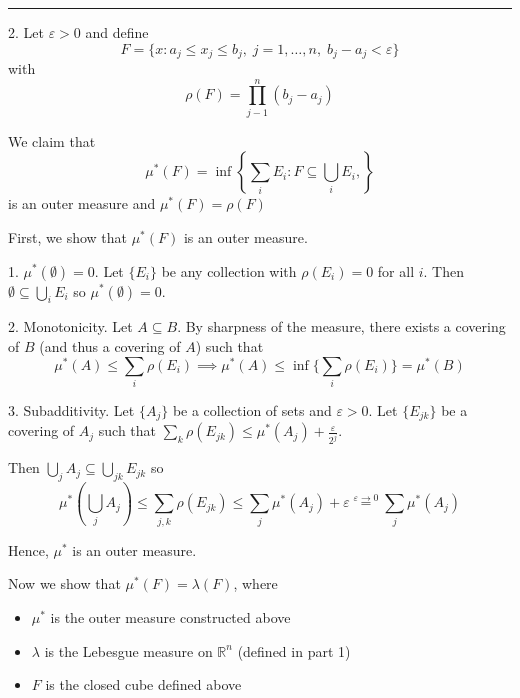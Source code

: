 \documentclass[12pt]{article}
\newcommand{\R}{\mathbb{R}}
\newcommand{\ep}{\varepsilon}
\newcommand{\sub}{\subseteq}
\renewcommand{\div}{\vspace*{10pt}\hrule\vspace*{10pt}}
\newenvironment*{proof}[1][blue]{
    \begin{tcolorbox}[
        parbox=false,
        colback=#1!5!white,
        colframe=#1!75!black,
        coltext=#1,
        breakable
    ]}
    {\end{tcolorbox}}
\begin{document}
    \div 

    2. Let $\ep > 0$ and define 
    \[F = \{x: a_j \leq x_j \leq b_j, \; j = 1, \dots, n,\; b_j - a_j < \ep\}\]
    with 
    \[\rho(F) = \prod_{j-1}^n (b_j - a_j)\]

    We claim that 
    \[\mu^*(F) = \inf\left\{\sum_i E_i : F \sub \bigcup_i E_i,\right\}\]    
    is an outer measure and $\mu^*(F) = \rho(F)$ 

    First, we show that $\mu^*(F)$ is an outer measure. 

    \begin{proof}
        1. $\mu^*(\emptyset) = 0$. Let $\{E_i\}$ be any collection with $\rho(E_i) = 0$ for all $i$. Then $\emptyset \sub \bigcup_i E_i$ so $\mu^*(\emptyset) = 0$.

        2. Monotonicity. Let $A \sub B$. By sharpness of the measure, there exists a covering of $B$ (and thus a covering of $A$) such that 
        \[\mu^*(A) \leq \sum_i \rho(E_i) \implies \mu^*(A) \leq \inf\{\sum_i \rho(E_i)\} = \mu^*(B)\]

        3. Subadditivity. Let $\{A_j\}$ be a collection of sets and $\ep > 0$. Let $\{E_{jk}\}$ be a covering of $A_j$ such that $\sum_k \rho(E_{jk}) \leq \mu^*(A_j) + \frac{\ep}{2^j}$. 

        Then $\bigcup_j A_j \sub \bigcup_{jk} E_{jk}$ so
        \[\mu^*\left(\bigcup_j A_j\right) \leq \sum_{j, k}\rho(E_{jk}) \leq \sum_j \mu^*(A_j) + \ep \overset{\ep \to 0}{=} \sum_j \mu^*(A_j)\]

        Hence, $\mu^*$ is an outer measure.
    \end{proof}

    Now we show that $\mu^*(F) = \lambda(F)$, where
    \begin{itemize}
        \item $\mu^*$ is the outer measure constructed above
        \item $\lambda$ is the Lebesgue measure on $\R^n$ (defined in part 1)
        \item $F$ is the closed cube defined above
    \end{itemize}
\end{document}
